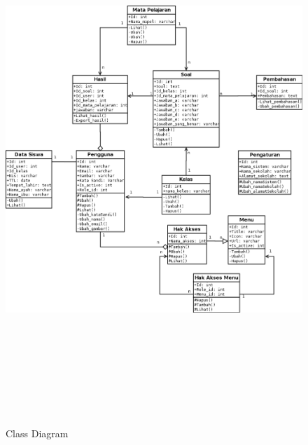 \documentclass{scrreprt}
\begin{document}
	
		\begin{figure}
			\includegraphics[width=15cm, height=20cm]{Class-diagram-wbt.png}
			\caption{Class Diagram}
		\end{figure}
\end{document}

